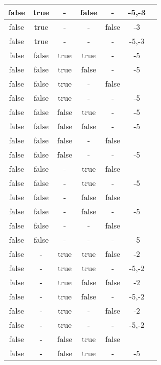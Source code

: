 \begin{longtable}{|c|c|c|c|c|c|c|}
false & true & - & false & - & -5,-3           &    \\ \hline 
false & true & - & - & false & -3              &    \\ \hline 
false & true & - & - & - & -5,-3           &    \\ \hline 
false & false & true & true & - & -5              &    \\ \hline 
false & false & true & false & - & -5              &    \\ \hline 
false & false & true & - & false &                 &    \\ \hline 
false & false & true & - & - & -5              &    \\ \hline 
false & false & false & true & - & -5              &    \\ \hline 
false & false & false & false & - & -5              &    \\ \hline 
false & false & false & - & false &                 &    \\ \hline 
false & false & false & - & - & -5              &    \\ \hline 
false & false & - & true & false &                 &    \\ \hline 
false & false & - & true & - & -5              &    \\ \hline 
false & false & - & false & false &                 &    \\ \hline 
false & false & - & false & - & -5              &    \\ \hline 
false & false & - & - & false &                 &    \\ \hline 
false & false & - & - & - & -5              &    \\ \hline 
false & - & true & true & false & -2              &    \\ \hline 
false & - & true & true & - & -5,-2           &    \\ \hline 
false & - & true & false & false & -2              &    \\ \hline 
false & - & true & false & - & -5,-2           &    \\ \hline 
false & - & true & - & false & -2              &    \\ \hline 
false & - & true & - & - & -5,-2           &    \\ \hline 
false & - & false & true & false &                 &    \\ \hline 
false & - & false & true & - & -5              &    \\ \hline 

\end{longtable}
